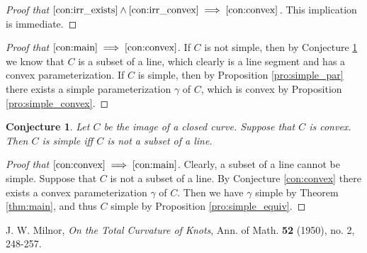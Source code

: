 \documentclass{amsart}
\newtheorem{conjecture}[proposition]{Conjecture}
\theoremstyle{definition}
\theoremstyle{remark}
\begin{document}
\begin{proof}[Proof that
    $\ref{con:irr_exists}\land\ref{con:irr_convex}
        \implies\ref{con:convex}$]
    This implication is immediate.
\end{proof}

\begin{proof}[Proof that $\ref{con:main}\implies\ref{con:convex}$]
    If $C$ is not simple, then by Conjecture
    \ref{con:main} we know that $C$ is a subset of a line,
    which clearly is a line segment and has a convex parameterization.
    If $C$ is simple, then by Proposition \ref{pro:simple_par}
    there exists a simple parameterization $\gamma$ of $C$,
    which is convex by Proposition \ref{pro:simple_convex}.
\end{proof}

\begin{conjecture}
    \label{con:main}
    Let $C$ be the image of a closed curve. Suppose that $C$ is convex.
    Then $C$ is simple iff $C$ is not a subset of a line.
\end{conjecture}

\begin{proof}[Proof that $\ref{con:convex}\implies\ref{con:main}$]
    Clearly, a subset of a line cannot be simple.
    Suppose that $C$ is not a subset of a line. By Conjecture
    \ref{con:convex} there exists a convex parameterization
    $\gamma$ of $C$. Then we have $\gamma$ simple by
    Theorem \ref{thm:main}, and thus $C$ simple by
    Proposition \ref{pro:simple_equiv}.
\end{proof}

\begin{thebibliography}{9}

    J. W. Milnor,
    \emph{On the Total Curvature of Knots},
    Ann. of Math.
    \textbf{52} (1950), no. 2, 248-257.

\end{thebibliography}
\end{document}
